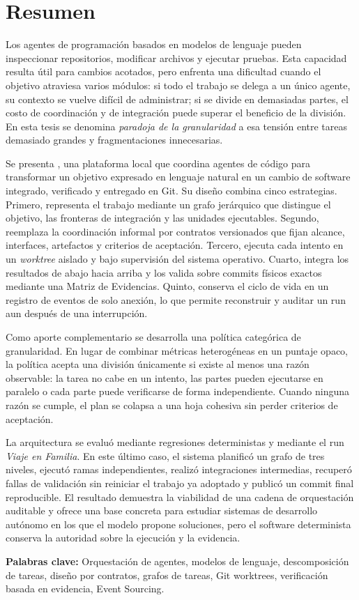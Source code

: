 \chapter*{Resumen}

Los agentes de programación basados en modelos de lenguaje pueden inspeccionar
repositorios, modificar archivos y ejecutar pruebas. Esta capacidad resulta
útil para cambios acotados, pero enfrenta una dificultad cuando el objetivo
atraviesa varios módulos: si todo el trabajo se delega a un único agente, su
contexto se vuelve difícil de administrar; si se divide en demasiadas partes,
el costo de coordinación y de integración puede superar el beneficio de la
división. En esta tesis se denomina \emph{paradoja de la granularidad} a esa
tensión entre tareas demasiado grandes y fragmentaciones innecesarias.

Se presenta \sistema, una plataforma local que coordina agentes de código para
transformar un objetivo expresado en lenguaje natural en un cambio de software
integrado, verificado y entregado en Git. Su diseño combina cinco estrategias.
Primero, representa el trabajo mediante un grafo jerárquico que distingue el
objetivo, las fronteras de integración y las unidades ejecutables. Segundo,
reemplaza la coordinación informal por contratos versionados que fijan alcance,
interfaces, artefactos y criterios de aceptación. Tercero, ejecuta cada intento
en un \emph{worktree} aislado y bajo supervisión del sistema operativo. Cuarto,
integra los resultados de abajo hacia arriba y los valida sobre commits físicos
exactos mediante una Matriz de Evidencias. Quinto, conserva el ciclo de vida en
un registro de eventos de solo anexión, lo que permite reconstruir y auditar un
run aun después de una interrupción.

Como aporte complementario se desarrolla una política categórica de
granularidad. En lugar de combinar métricas heterogéneas en un puntaje opaco,
la política acepta una división únicamente si existe al menos una razón
observable: la tarea no cabe en un intento, las partes pueden ejecutarse en
paralelo o cada parte puede verificarse de forma independiente. Cuando ninguna
razón se cumple, el plan se colapsa a una hoja cohesiva sin perder criterios de
aceptación.

La arquitectura se evaluó mediante regresiones deterministas y mediante el run
\emph{Viaje en Familia}. En este último caso, el sistema planificó un grafo de
tres niveles, ejecutó ramas independientes, realizó integraciones intermedias,
recuperó fallas de validación sin reiniciar el trabajo ya adoptado y publicó un
commit final reproducible. El resultado demuestra la viabilidad de una cadena
de orquestación auditable y ofrece una base concreta para estudiar sistemas de
desarrollo autónomo en los que el modelo propone soluciones, pero el software
determinista conserva la autoridad sobre la ejecución y la evidencia.

\vspace{1em}
\noindent\textbf{Palabras clave:} Orquestación de agentes, modelos de lenguaje,
descomposición de tareas, diseño por contratos, grafos de tareas, Git
worktrees, verificación basada en evidencia, Event Sourcing.

\clearpage
